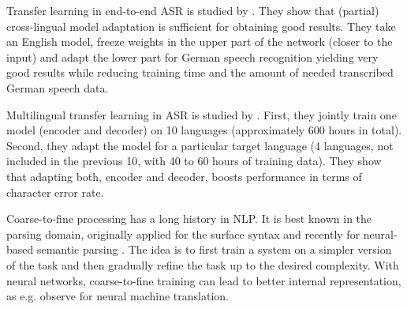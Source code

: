 Transfer learning in end-to-end ASR is studied by  . They show that (partial) cross-lingual model adaptation is sufficient for obtaining good results. They take an English model, freeze weights in the upper part of the network (closer to the input) and adapt the lower part for German speech recognition yielding very good results while reducing training time and the amount of needed transcribed German speech data.



Multilingual transfer learning in ASR is studied by . First, they jointly train one model (encoder and decoder) on 10 languages (approximately 600 hours in total). Second, they adapt the model %
for a particular target language (4 languages, not included in the previous 10, with 40 to 60 hours of training data). They show that adapting both, encoder and decoder, boosts performance in terms of character error rate.

Coarse-to-fine processing  has a long history in NLP. It is best known in the parsing domain, originally applied for the surface syntax  and recently for neural-based semantic parsing . The idea is to first train a system on a simpler version of the task and then gradually refine the task up to the desired complexity. With neural networks, coarse-to-fine training can lead to better internal representation, as e.g.  observe for neural machine translation.

